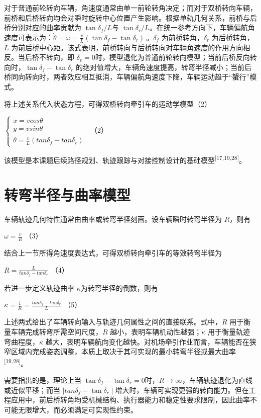 对于普通前轮转向车辆，角速度通常由单一前轮转角决定；而对于双桥转向车辆，前桥和后桥转向均会对瞬时旋转中心位置产生影响。根据单轨几何关系，前桥与后桥分别对应的曲率贡献为
\(\tan\delta_{f}/L\)与
\(\tan\delta_{r}/L\)。在统一参考方向下，车辆偏航角速度可表示为：\(\dot{\theta} = \omega = \frac{v}{L}\left( \tan\delta_{f} - \tan\delta_{r} \right)\ 。\delta_{f}\)
为前桥转角，\(\delta_{r}\) 为后桥转角，\(L\)
为前后桥中心距。该式表明，前桥转向与后桥转向对车辆角速度的作用方向相反。当后桥不转向，即
\(\delta_{r} = 0\)时，模型退化为普通前轮转向模型；当前后桥反向转向时，\(\tan\delta_{f} - \tan\delta_{r}\)
的绝对值增大，车辆角速度提高，转弯半径减小；当前后桥同向转向时，两者效应相互抵消，车辆偏航角速度下降，车辆运动趋于“蟹行”模式。

将上述关系代入状态方程，可得双桥转向牵引车的运动学模型（2）

\(\left\{ \begin{array}{r}
\dot{x} = vcos\theta \\
\dot{y} = vsin\theta \\
\dot{\theta} = \frac{v}{L}\left( tan\delta_{f} - tan\delta_{r} \right)
\end{array} \right.\ \) （2）

该模型是本课题后续路径规划、轨迹跟踪与对接控制设计的基础模型\textsuperscript{[17,19,28]}。

\section{转弯半径与曲率模型}

车辆轨迹几何特性通常由曲率或转弯半径刻画。设车辆瞬时转弯半径为
\(R\)，则有

\(\omega = \frac{v}{R}\) （3）

结合上一节所得角速度表达式，可得双桥转向牵引车的等效转弯半径为

\(R = \frac{L}{tan\delta_{f} - tan\delta_{r}}\) （4）

若进一步定义轨迹曲率 \(\kappa\)为转弯半径的倒数，则有

\(\kappa = \frac{1}{R} = \frac{tan\delta_{f} - tan\delta_{r}}{L}\) （5）

上述两式给出了车辆转向输入与轨迹几何属性之间的直接联系。式中，\(R\)
用于衡量车辆完成转弯所需空间尺度，\(R\)
越小，表明车辆机动性越强；\(\kappa\) 用于衡量轨迹弯曲程度，\(\kappa\)
越大，表明车辆航向变化越快。对机场牵引作业而言，车辆能否在狭窄区域内完成姿态调整，本质上取决于其可实现的最小转弯半径或最大曲率\textsuperscript{[19,28]}。

需要指出的是，理论上当
\(\tan\delta_{f} - \tan\delta_{r} = 0\)时，\(R \rightarrow \infty\)，车辆轨迹退化为直线或近似平移；而当
\(\mid tan\delta_{f} - \tan\delta_{r} \mid\)增大时，车辆可实现更强的转向能力。但在工程应用中，前后桥转角均受机械结构、执行器能力和稳定性要求限制，因此曲率不可能无限增大，而必须满足可实现性约束。

